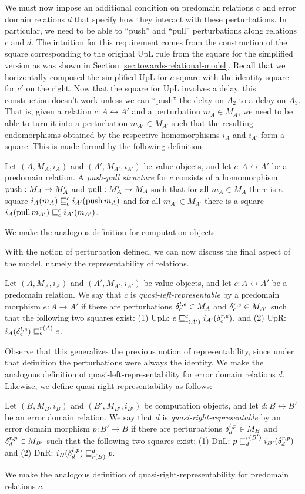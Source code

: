 We must now impose an additional condition on predomain relations $c$ and error
domain relations $d$ that specify how they interact with these perturbations. In
particular, we need to be able to ``push'' and ``pull'' perturbations along
relations $c$ and $d$. The intuition for this requirement comes from the
construction of the square corresponding to the original UpL rule from the
square for the simplified version as was shown in Section
\ref{sec:towards-relational-model}. Recall that we horizontally composed the
simplified UpL for $c$ square with the identity square for $c'$ on the right.
Now that the square for UpL involves a delay, this construction doesn't work
unless we can ``push'' the delay on $A_2$ to a delay on $A_3$. That is, given a
relation $c : A \rel A'$ and a perturbation $m_A \in M_A$, we need to be able to
turn it into a perturbation $m_{A'} \in M_{A'}$ such that the resulting
endomorphisms obtained by the respective homomorphisms $i_A$ and $i_{A'}$ form a
square. This is made formal by the following definition:
%
\begin{definition}
    Let $(A, M_A, i_A)$ and $(A', M_{A'}, i_{A'})$ be value objects, and let
    $c : A \rel A'$ be a predomain relation. A \emph{push-pull structure} for
    $c$ consists of a homomorphism $\text{push} : M_A \to M_A'$ and $\text{pull} : M_A' \to
    M_A$ such that for all $m_A \in M_A$ there is a square $i_A(m_A) \mathrel{\sqsubseteq^{c}_{c}}
    i_{A'}(\text{push}\, m_A)$ and for all $m_{A'} \in M_{A'}$ there is a square
    $i_A(\text{pull}\, m_{A'}) \mathrel{\sqsubseteq^{c}_{c}} i_{A'}(m_{A'})$.
\end{definition}
%
We make the analogous definition for computation objects.

With the notion of perturbation defined, we can now discuss the final aspect of
the model, namely the representability of relations.
%
\begin{definition}
Let $(A, M_A, i_A)$ and $(A', M_{A'}, i_{A'})$ be value objects, and let $c : A
\rel A'$ be a predomain relation. We say that $c$ is
\emph{quasi-left-representable} by a predomain morphism $e : A \to A'$ if there
are perturbations $\delta^{l,e}_c \in M_A$ and $\delta^{r,e}_c \in M_{A'}$ such that the
following two squares exist: (1) UpL: $e \mathrel{\sqsubseteq^{c}_{r(A')}} i_{A'}(\delta^{r,e}_c)$, and
(2) UpR: $i_A(\delta^{l,e}_c) \mathrel{\sqsubseteq^{r(A)}_{c}} e$.
\end{definition}
%
Observe that this generalizes the previous notion of representability, since
under that definition the perturbations were always the identity.
%
We make the analogous definition of quasi-left-representability for error domain
relations $d$.
%
Likewise, we define quasi-right-representability as follows:
%
\begin{definition}
Let $(B, M_B, i_B)$ and $(B', M_{B'}, i_{B'})$ be computation objects, and let
$d : B \rel B'$ be an error domain relation. We say that $d$ is
\emph{quasi-right-representable} by an error domain morphism $p : B' \to B$ if
there are perturbations $\delta^{l,p}_d \in M_B$ and $\delta^{r,p}_d \in M_{B'}$ such that
the following two squares exist: 
(1) DnL: $p \mathrel{\sqsubseteq^{r(B')}_{d}} i_{B'}(\delta^{r,p}_d)$ and
(2) DnR: $i_B(\delta^{l,p}_d) \mathrel{\sqsubseteq^{d}_{r(B)}} p$.
\end{definition}
%
We make the analogous definition of quasi-right-representability for predomain
relations $c$.

